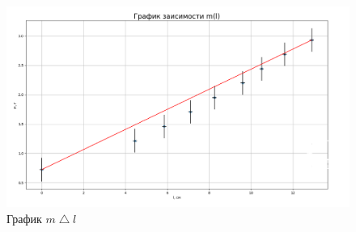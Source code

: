 \documentclass[a4paper]{article}
\begin{document}
\begin{figure}[h]
    \centering
    \includegraphics[width=1\textwidth]{pick2.PNG} 
    \caption{График $m\bigtriangleup l$}
    \end{figure}
\end{document}
